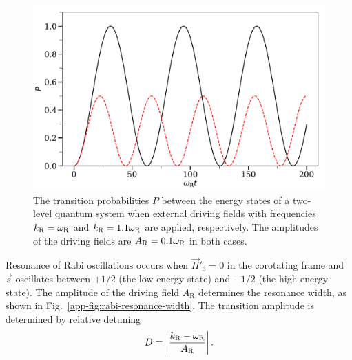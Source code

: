 \begin{figure}[htbp]
    \centering
    \includegraphics[width=\textwidth]{chapters/assets/app/rabi-oscillations}
    \caption{The transition probabilities $P$ between the energy states of a two-level quantum system when external driving fields with frequencies $k_\mathrm R = \omega_\mathrm R$ and $k_\mathrm R=1.1\omega_\mathrm R$ are applied, respectively. The amplitudes of the driving fields are $A_\mathrm R=0.1\omega_\mathrm R$ in both cases. }
    \label{app-fig:rabi-examples}
\end{figure}

Resonance of Rabi oscillations occurs when $\vec{H}'_3=0$ in the corotating frame and $\vec{s}$ oscillates between $+1/2$ (the low energy state) and $-1/2$ (the high energy state). 
The amplitude of the driving field $A_{\mathrm{R}}$ determines the resonance width,
as shown in Fig.~\ref{app-fig:rabi-resonance-width}. The transition amplitude is determined by relative detuning
\begin{equation}
    \RD = \left\lvert \frac{ k_{\mathrm R} - \omega_{\mathrm R}}{A_{\mathrm R}} \right\rvert.
    \label{chap:app-sec:rabi-oscillations-eqn:relative-detuning-def}
\end{equation}


